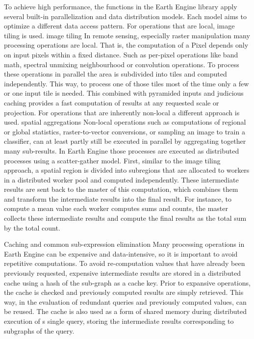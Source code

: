 \documentclass[11pt,twoside,a4paper,final]{report}
\begin{document}
To achieve high performance, the functions in the Earth Engine library apply several built-in parallelization and data distribution models. Each model aims to optimize a different data access pattern.
For operations that are local, image tiling is used.
image tiling
In remote sensing, especially raster manipulation many processing operations are local. That is, the computation of a Pixel depends only on input pixels within a fixed distance. Such as per-pixel operations like band math, spectral unmixing neighbourhood or convolution operations. To process these operations in parallel the area is subdivided into tiles and computed independently. This way, to process one of those tiles most of the time only a few or one input tile is needed. This combined with pyramided inputs and judicious caching provides a fast computation of results at any requested scale or projection.
For operations that are inherently non-local a different approach is used.
spatial aggregations
Non-local operations such as computations of regional or global statistics, raster-to-vector conversions, or sampling an image to train a classifier, can at least partly still be executed in parallel by aggregating together many sub-results. In Earth Engine those processes are executed as distributed processes using a scatter-gather model. First, similar to the image tiling approach, a spatial region is divided into subregions that are allocated to workers in a distributed worker pool and computed independently. These intermediate results are sent back to the master of this computation, which combines them and transform the intermediate results into the final result. For instance, to compute a mean value each worker computes sums and counts, the master collects these intermediate results and compute the final results as the total sum by the total count.

Caching and common sub-expression elimination
Many processing operations in Earth Engine can be expensive and data-intensive, so it is important to avoid repetitive computations. To avoid re-computation values that have already been previously requested, expensive intermediate results are stored in a distributed cache using a hash of the sub-graph as a cache key. Prior to expansive operations, the cache is checked and previously computed results are simply retrieved.
This way, in the evaluation of redundant queries and previously computed values, can be reused. The cache is also used as a form of shared memory during distributed execution of s single query, storing the intermediate results corresponding to subgraphs of the query.
\end{document}
